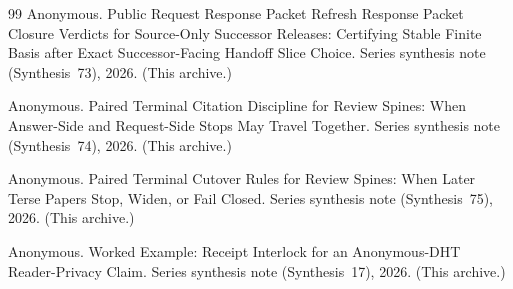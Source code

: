 \documentclass[11pt]{article}
\begin{document}
\begin{thebibliography}{99}
Anonymous.
\newblock Public Request Response Packet Refresh Response Packet Closure Verdicts for Source-Only Successor Releases: Certifying Stable Finite Basis after Exact Successor-Facing Handoff Slice Choice.
\newblock Series synthesis note (Synthesis~73), 2026. (This archive.)

Anonymous.
\newblock Paired Terminal Citation Discipline for Review Spines: When Answer-Side and Request-Side Stops May Travel Together.
\newblock Series synthesis note (Synthesis~74), 2026. (This archive.)

Anonymous.
\newblock Paired Terminal Cutover Rules for Review Spines: When Later Terse Papers Stop, Widen, or Fail Closed.
\newblock Series synthesis note (Synthesis~75), 2026. (This archive.)

Anonymous.
\newblock Worked Example: Receipt Interlock for an Anonymous-DHT Reader-Privacy Claim.
\newblock Series synthesis note (Synthesis~17), 2026. (This archive.)

\end{thebibliography}
\end{document}
